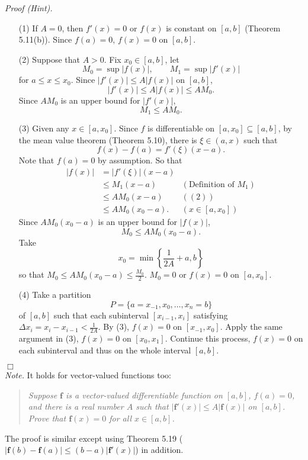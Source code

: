 \documentclass{article}
\begin{document}
\emph{Proof (Hint).}
\begin{enumerate}
\item[(1)]
If $A = 0$, then $f'(x) = 0$ or $f(x)$ is constant on $[a,b]$ (Theorem 5.11(b)).
Since $f(a) = 0$, $f(x) = 0$ on $[a,b]$.

\item[(2)]
Suppose that $A > 0$.
Fix $x_0 \in [a,b]$, let
\[
  M_0 = \sup{|f(x)|}, \qquad M_1 = \sup{|f'(x)|}
\]
for $a \leq x \leq x_0$.
Since $|f'(x)| \leq A|f(x)|$ on $[a,b]$,
\[
  |f'(x)| \leq A|f(x)| \leq A M_0.
\]
Since $A M_0$ is an upper bound for $|f'(x)|$,
\[
  M_1 \leq A M_0.
\]

\item[(3)]
Given any $x \in [a,x_0]$.
Since $f$ is differentiable on $[a,x_0] \subseteq [a,b]$,
by the mean value theorem (Theorem 5.10), there is $\xi \in (a,x)$
such that
\[
  f(x) - f(a) = f'(\xi)(x - a).
\]
Note that $f(a) = 0$ by assumption.
So that
\begin{align*}
  |f(x)|
  &= |f'(\xi)|(x - a) \\
  &\leq M_1 (x - a)
    &(\text{Definition of $M_1$}) \\
  &\leq A M_0 (x - a)
    &((2)) \\
  &\leq A M_0 (x_0 - a).
    &(x \in [a,x_0])
\end{align*}
Since $A M_0 (x_0 - a)$ is an upper bound for $|f(x)|$,
\[
  M_0 \leq A M_0 (x_0 - a).
\]
Take
\[
  x_0 = \min \left\{ \frac{1}{2A} + a, b \right\}
\]
so that $M_0 \leq A M_0 (x_0 - a) \leq \frac{M_0}{2}$.
$M_0 = 0$ or $f(x) = 0$ on $[a,x_0]$.

\item[(4)]
Take a partition
\[
  P = \{ a = x_{-1}, x_0, \ldots, x_n = b \}
\]
of $[a,b]$ such that each subinterval $[x_{i-1},x_i]$ satisfying
$\Delta x_i = x_i - x_{i-1} < \frac{1}{2A}$.
By (3), $f(x) = 0$ on $[x_{-1},x_0]$.
Apply the same argument in (3), $f(x) = 0$ on $[x_0,x_1]$.
Continue this process, $f(x) = 0$ on each subinterval and thus on the whole interval $[a,b]$.
\end{enumerate}
$\Box$ \\



\emph{Note.}
It holds for vector-valued functions too:
\begin{quote}
\emph{Suppose $\mathbf{f}$ is a vector-valued differentiable function on $[a,b]$, $f(a) = 0$,
and there is a real number $A$ such that $|\mathbf{f}'(x)| \leq A|\mathbf{f}(x)|$ on $[a,b]$.
Prove that $\mathbf{f}(x)=0$ for all $x \in [a,b]$.}
\end{quote}
The proof is similar except using Theorem 5.19
($|\mathbf{f}(b) - \mathbf{f}(a)| \leq (b-a)|\mathbf{f}'(x)|$)
in addition. \\\\
\end{document}
